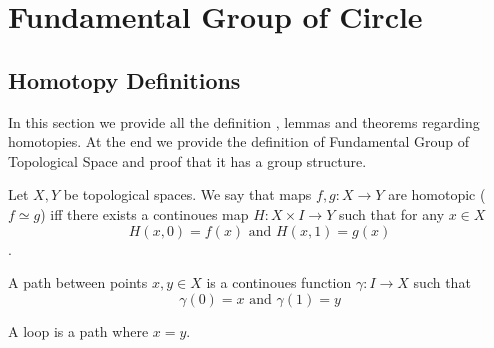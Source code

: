 %

\chapter{Fundamental Group of Circle}

    \section{Homotopy Definitions}

    In this section we provide all the definition , lemmas and theorems regarding homotopies. 
    At the end we provide the definition of Fundamental Group of Topological Space and proof that it
    has a group structure.

    \begin{definition}
        \label{def:homotopy}
        
        Let $X,Y$ be topological spaces. We say that maps $f,g : X \to Y$ are homotopic ($f \simeq g$) iff there exists a continoues map $H : X \times I \to Y$ such that
        for any $x \in X$ 
            $$H(x,0) =  f(x) \text{ and } H(x,1) = g(x)$$.
    \end{definition}

    \begin{definition}[Path]
        \label{def:path}

        A path between points $x,y \in X$ is a continoues function $\gamma : I \to X$ such that 
            $$\gamma(0) = x \text{ and } \gamma(1) = y$$

    \end{definition}

    \begin{definition}[Loop]
        \label{def:loop}

        A loop is a path where $x = y$.
    \end{definition}

